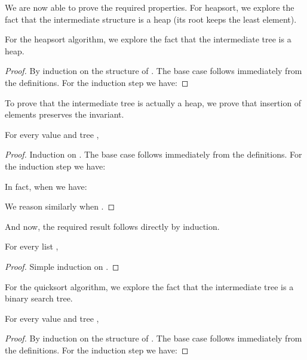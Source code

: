 \documentclass[a4paper,11pt]{llncs}
\begin{document}
We are now able to prove the required properties. For heapsort, we
explore the fact that the intermediate structure is a heap (its root
keeps the least element).

For the heapsort algorithm, we explore the fact that the intermediate
tree is a heap.

\begin{proposition}
\label{prop:h2ist}
  
\end{proposition}
\begin{proof}
  By induction on the structure of . The base case follows
  immediately from the definitions. For the induction step we have:

\end{proof}

To prove that the intermediate tree is actually a heap,
we prove that insertion of elements preserves the invariant.

\begin{proposition}
For every value  and tree ,

\end{proposition}
\begin{proof}
  Induction on . The base case follows immediately from the
  definitions. For the induction step we have:

\noindent In fact, when  we have:

\noindent We reason similarly when .
\end{proof}

And now, the required result follows directly by induction.

\begin{corollary}
\label{prop:buildh}
For every list ,

\end{corollary}
\begin{proof}
  Simple induction on .
\end{proof}

For the quicksort algorithm, we explore the fact that the intermediate
tree is a binary search tree.

\begin{proposition}
\label{prop:bst2ist}
For every value  and tree ,
  
\end{proposition}
\begin{proof}
  By induction on the structure of . The base case follows
  immediately from the definitions. For the induction step we have:

\end{proof}
\end{document}
